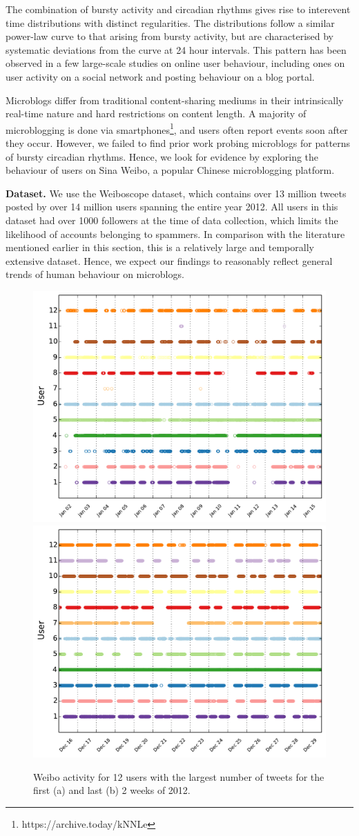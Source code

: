 \documentclass[onesided,letterpaper]{tufte-book}
\begin{document}
The combination of bursty activity and circadian rhythms gives rise to interevent time distributions with distinct regularities. The distributions follow a similar power-law curve to that arising from bursty activity, but are characterised by systematic deviations from the curve at 24 hour intervals. This pattern has been observed in a few large-scale studies on online user behaviour, including ones on user activity on a social network\cite{chun2008comparison} and posting behaviour on a blog portal\cite{kim2013microscopic}.

Microblogs differ from traditional content-sharing mediums in their intrinsically real-time nature and hard restrictions on content length. A majority of microblogging is done via smartphones\footnote{https://archive.today/kNNLe}, and users often report events soon after they occur. However, we failed to find prior work probing microblogs for patterns of bursty circadian rhythms. Hence, we look for evidence by exploring the behaviour of users on Sina Weibo, a popular Chinese microblogging platform.

\textbf{Dataset.} We use the Weiboscope dataset\cite{fu2013assessing}, which contains over 13 million tweets posted by over 14 million users spanning the entire year 2012. All users in this dataset had over 1000 followers at the time of data collection, which limits the likelihood of accounts belonging to spammers. In comparison with the literature mentioned earlier in this section, this is a relatively large and temporally extensive dataset. Hence, we expect our findings to reasonably reflect general trends of human behaviour on microblogs.

\begin{figure}[t]
        \includegraphics[width=0.5\linewidth]{12users_first2weeks}
        \includegraphics[width=0.5\linewidth]{12users_last2weeks}
    \caption[Weibo activity in 2012.]{Weibo activity for 12 users with the largest number of tweets for the first (a) and last (b) 2 weeks of 2012.}
    \label{fig:weibo-activity}
    \forcerectofloat
\end{figure}
\end{document}

